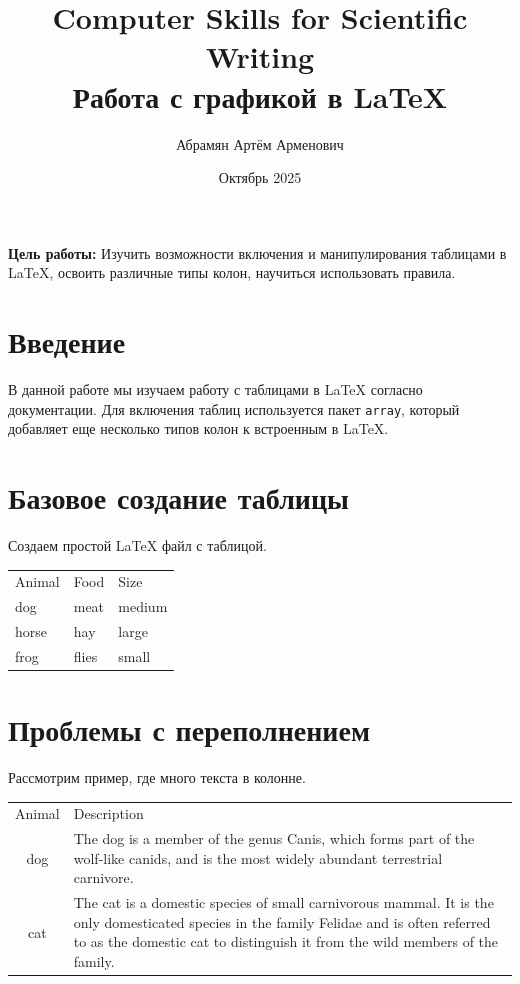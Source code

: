 \documentclass{article}
\title{Computer Skills for Scientific Writing\\Работа с графикой в LaTeX}
\author{Абрамян Артём Арменович}
\date{Октябрь 2025}
\begin{document}
  \maketitle
  \pagebreak

  \textbf{Цель работы:} Изучить возможности включения и манипулирования таблицами в LaTeX, освоить различные типы колон, научиться использовать правила.\smallskip

  \section{Введение}
  \label{sec:intro}
  
  В данной работе мы изучаем работу с таблицами в LaTeX согласно документации. Для включения таблиц используется пакет \texttt{array}, который добавляет еще несколько типов колон к встроенным в LaTeX.

  \section{Базовое создание таблицы}
  \label{sec:basic}
  
  Создаем простой LaTeX файл с таблицой.

  \smallskip


  \begin{tabular}{lll}
    Animal & Food & Size \\
    dog & meat & medium \\
    horse & hay & large \\
    frog & flies & small \\
  \end{tabular}




  \section{Проблемы с переполнением}
  \label{sec:overflow}
  
  Рассмотрим пример, где много текста в колонне.

  \smallskip

  \begin{tabular}{cl}
    Animal & Description \\
    dog & The dog is a member of the genus Canis, which forms
    part of the
    wolf-like canids, and is the most widely abundant
    terrestrial
    carnivore. \\
    cat & The cat is a domestic species of small carnivorous
    mammal. It is the
    only domesticated species in the family Felidae and
    is often referred
    to as the domestic cat to distinguish it from the
    wild members of the
    family. \\
  \end{tabular}
\end{document}
